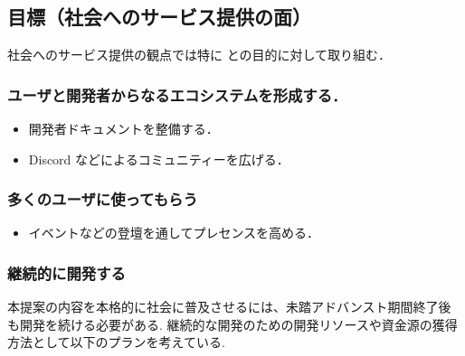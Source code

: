 \subsection{目標（社会へのサービス提供の面）}

社会へのサービス提供の観点では特に
との目的に対して取り組む．

\subsubsection{ユーザと開発者からなるエコシステムを形成する．}

\begin{itemize}
  \item 開発者ドキュメントを整備する．
  \item Discord などによるコミュニティーを広げる． %
\end{itemize}

\subsubsection{多くのユーザに使ってもらう}

\begin{itemize}
  \item イベントなどの登壇を通してプレセンスを高める．%
\end{itemize}

\subsubsection{継続的に開発する}
本提案の内容を本格的に社会に普及させるには、未踏アドバンスト期間終了後も開発を続ける必要がある.
継続的な開発のための開発リソースや資金源の獲得方法として以下のプランを考えている.


